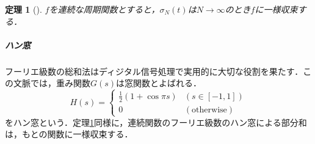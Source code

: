 \documentclass[dvipdfmx,a4j,10pt]{jsarticle}
\theoremstyle{mystyle1}
\newtheorem{theorem}[definition]{定理}
\theoremstyle{mystyle3}
\theoremstyle{mystyle4}
\theoremstyle{mystyle2}
\newenvironment{thm}[1][]
{\begin{tcolorbox}[
    enhanced,
    boxrule=0pt,
    arc=0mm,
    frame hidden,
    borderline west={2pt}{-4pt}{red},
    breakable = true
    ]
    \begin{theorem}[#1]
}
{\end{theorem}\end{tcolorbox}}
\begin{document}
\begin{thm}\label{thm:1-14}
    $f$を連続な周期関数とすると，$\sigma_N(t)$は$N\to\infty$のとき$f$に一様収束する．
\end{thm}

\subparagraph{ハン窓}

フーリエ級数の総和法はディジタル信号処理で実用的に大切な役割を果たす．この文脈では，重み関数$G(s)$は窓関数とよばれる．
\[
    H(s)=\begin{cases}
        \frac{1}{2}(1+\cos\pi s) & (s\in[-1,1])         \\
        0                        & (\textrm{otherwise})
    \end{cases}
\]
をハン窓という．定理\ref{thm:1-14}同様に，連続関数のフーリエ級数のハン窓による部分和は，もとの関数に一様収束する．
\end{document}
